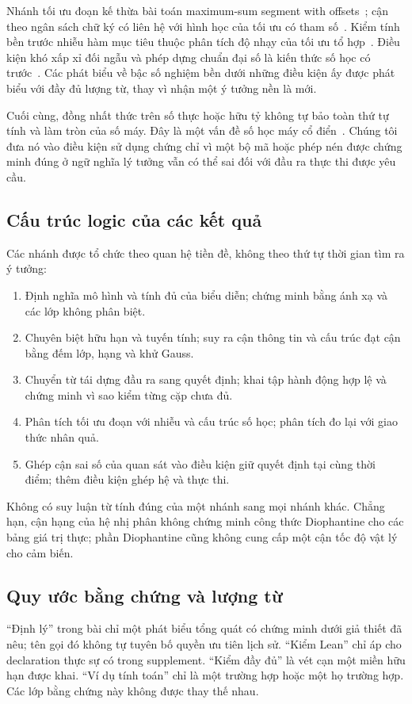 Nhánh tối ưu đoạn kế thừa bài toán maximum-sum segment with offsets~\cite{sakai,jo}; cận theo ngân sách chữ ký có liên hệ với hình học của tối ưu có tham số~\cite{gusfield}. Kiểm tính bền trước nhiễu hàm mục tiêu thuộc phân tích độ nhạy của tối ưu tổ hợp~\cite{chak}. Điều kiện khó xấp xỉ đối ngẫu và phép dựng chuẩn đại số là kiến thức số học có trước~\cite{fgm}. Các phát biểu về bậc số nghiệm bền dưới những điều kiện ấy được phát biểu với đầy đủ lượng từ, thay vì nhận một ý tưởng nền là mới.

Cuối cùng, đồng nhất thức trên số thực hoặc hữu tỷ không tự bảo toàn thứ tự tính và làm tròn của số máy. Đây là một vấn đề số học máy cổ điển~\cite{goldberg}. Chúng tôi đưa nó vào điều kiện sử dụng chứng chỉ vì một bộ mã hoặc phép nén được chứng minh đúng ở ngữ nghĩa lý tưởng vẫn có thể sai đối với đầu ra thực thi được yêu cầu.

\subsection{Cấu trúc logic của các kết quả}
Các nhánh được tổ chức theo quan hệ tiền đề, không theo thứ tự thời gian tìm ra ý tưởng:
\begin{enumerate}
\item Định nghĩa mô hình và tính đủ của biểu diễn; chứng minh bằng ánh xạ và các lớp không phân biệt.
\item Chuyên biệt hữu hạn và tuyến tính; suy ra cận thông tin và cấu trúc đạt cận bằng đếm lớp, hạng và khử Gauss.
\item Chuyển từ tái dựng đầu ra sang quyết định; khai tập hành động hợp lệ và chứng minh vì sao kiểm từng cặp chưa đủ.
\item Phân tích tối ưu đoạn với nhiễu và cấu trúc số học; phân tích đo lại với giao thức nhân quả.
\item Ghép cận sai số của quan sát vào điều kiện giữ quyết định tại cùng thời điểm; thêm điều kiện ghép hệ và thực thi.
\end{enumerate}
Không có suy luận từ tính đúng của một nhánh sang mọi nhánh khác. Chẳng hạn, cận hạng của hệ nhị phân không chứng minh công thức Diophantine cho các bảng giá trị thực; phần Diophantine cũng không cung cấp một cận tốc độ vật lý cho cảm biến.

\subsection{Quy ước bằng chứng và lượng từ}
``Định lý'' trong bài chỉ một phát biểu tổng quát có chứng minh dưới giả thiết đã nêu; tên gọi đó không tự tuyên bố quyền ưu tiên lịch sử. ``Kiểm Lean'' chỉ áp cho declaration thực sự có trong supplement. ``Kiểm đầy đủ'' là vét cạn một miền hữu hạn được khai. ``Ví dụ tính toán'' chỉ là một trường hợp hoặc một họ trường hợp. Các lớp bằng chứng này không được thay thế nhau.

